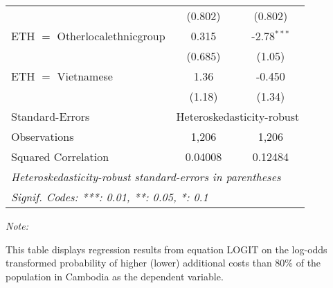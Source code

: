 \begin{table}[htbp!]
\begin{adjustbox}{width = 1\textwidth, max height = 0.95\textheight, center}
\begin{threeparttable}[b]
\begin{tabular}{lcc}
                                          & (0.802)        & (0.802)\\   
            ETH $=$ Otherlocalethnicgroup & 0.315          & -2.78$^{***}$\\   
                                          & (0.685)        & (1.05)\\   
            ETH $=$ Vietnamese            & 1.36           & -0.450\\   
                                          & (1.18)         & (1.34)\\   
            \midrule 
            Standard-Errors & \multicolumn{2}{c}{Heteroskedasticity-robust} \\ 
            Observations                  & 1,206          & 1,206\\  
            Squared Correlation           & 0.04008        & 0.12484\\  
            \midrule \midrule
            \multicolumn{3}{l}{\emph{Heteroskedasticity-robust standard-errors in parentheses}}\\
            \multicolumn{3}{l}{\emph{Signif. Codes: ***: 0.01, **: 0.05, *: 0.1}}\\
         \end{tabular}
         
         \begin{tablenotes}\item \medskip \textit{Note:}
            \item This table displays regression results from equation LOGIT on the log-odds transformed probability of higher (lower) additional costs than 80\% of the population in Cambodia as the dependent variable. 
         \end{tablenotes}
      \end{threeparttable}
   \end{adjustbox}
\end{table}


